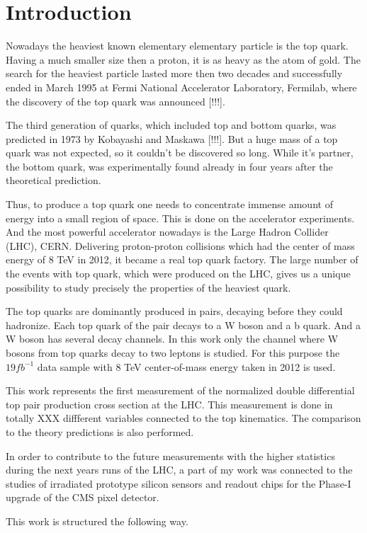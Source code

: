 \chapter{Introduction}

Nowadays the heaviest known elementary elementary particle is the top quark. 
Having a much smaller size then a proton, it is as heavy as the atom of gold. 
The search for the heaviest particle lasted more then two decades and successfully 
ended in March 1995 at Fermi National Accelerator Laboratory, Fermilab, where 
the discovery of the top quark was announced [!!!]. 

The third generation of quarks, which included top and bottom quarks, 
was predicted in 1973 by Kobayashi and Maskawa [!!!]. But a huge mass of a 
top quark was not expected, so it couldn't be discovered so long. While it's partner, 
the bottom quark, was experimentally found already in four years after the theoretical prediction. 

Thus, to produce a top quark one needs to concentrate immense amount of energy 
into a small region of space. This is done on the accelerator experiments. 
And the most powerful accelerator nowadays is the Large Hadron Collider (LHC), CERN. 
Delivering proton-proton collisions which had the center of mass energy of 8 TeV in 2012, 
it became a real top quark factory. The large number of the events with top quark, 
which were produced on the LHC, gives us a unique possibility to study precisely the properties of the heaviest quark. 

The top quarks are dominantly produced in pairs, decaying before they could hadronize. 
Each top quark of the pair decays to a W boson and a b quark. 
And a W boson has several decay channels. In this work only the channel 
where W bosons from top quarks decay to two leptons is studied. 
For this purpose the $19 fb^{-1}$ data sample with 8 TeV center-of-mass energy taken in 2012 is used.

This work represents the first measurement of the normalized double differential top pair production
cross section at the LHC. This measurement is done in totally XXX diffferent variables
connected to the top kinematics. The comparison to the theory predictions is also performed.

In order to contribute to the future measurements with the higher statistics during
the next years runs of the LHC, a part of my work was connected to the studies of irradiated
prototype silicon sensors and readout chips for the Phase-I upgrade of the CMS pixel detector.

This work is structured the following way.